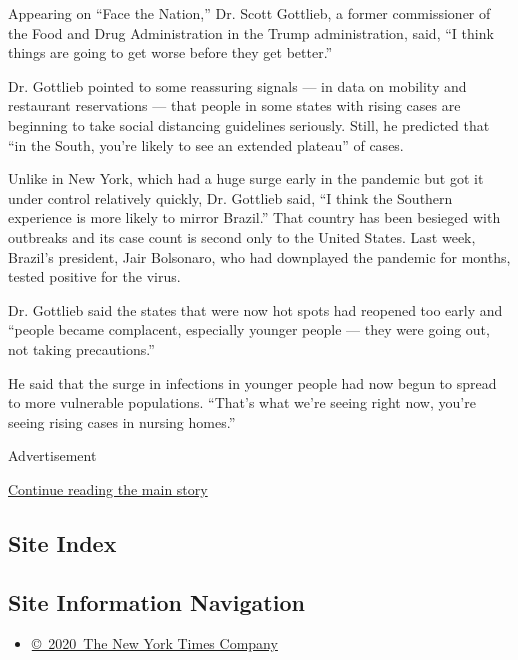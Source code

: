 Appearing on ``Face the Nation,'' Dr. Scott Gottlieb, a former
commissioner of the Food and Drug Administration in the Trump
administration, said, ``I think things are going to get worse before
they get better.''

Dr. Gottlieb pointed to some reassuring signals --- in data on mobility
and restaurant reservations --- that people in some states with rising
cases are beginning to take social distancing guidelines seriously.
Still, he predicted that ``in the South, you're likely to see an
extended plateau'' of cases.

Unlike in New York, which had a huge surge early in the pandemic but got
it under control relatively quickly, Dr. Gottlieb said, ``I think the
Southern experience is more likely to mirror Brazil.'' That country has
been besieged with outbreaks and its case count is second only to the
United States. Last week, Brazil's president, Jair Bolsonaro, who had
downplayed the pandemic for months, tested positive for the virus.

Dr. Gottlieb said the states that were now hot spots had reopened too
early and ``people became complacent, especially younger people --- they
were going out, not taking precautions.''

He said that the surge in infections in younger people had now begun to
spread to more vulnerable populations. ``That's what we're seeing right
now, you're seeing rising cases in nursing homes.''

Advertisement

\protect\hyperlink{after-bottom}{Continue reading the main story}

\hypertarget{site-index}{%
\subsection{Site Index}\label{site-index}}

\hypertarget{site-information-navigation}{%
\subsection{Site Information
Navigation}\label{site-information-navigation}}

\begin{itemize}
\tightlist
\item
  \href{https://help.nytimes3xbfgragh.onion/hc/en-us/articles/115014792127-Copyright-notice}{©~2020~The
  New York Times Company}
\end{itemize}

